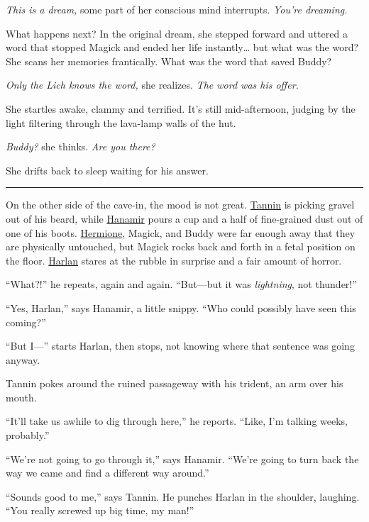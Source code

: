\documentclass[smalldemyvopaper,11pt,twoside,onecolumn,openright,extrafontsizes]{memoir}
\begin{document}
\emph{This is a dream,} some part of her conscious mind interrupts.
\emph{You're dreaming.}

What happens next? In the original dream, she stepped forward and
uttered a word that stopped Magick and ended her life instantly\ldots{}
but what was the word? She scans her memories frantically. What was the
word that saved Buddy?

\emph{Only the Lich knows the word,} she realizes. \emph{The word was
his offer.}

She startles awake, clammy and terrified. It's still mid-afternoon,
judging by the light filtering through the lava-lamp walls of the hut.

\emph{Buddy?} she thinks. \emph{Are you there?}

She drifts back to sleep waiting for his answer.

\begin{center}\rule{0.5\linewidth}{\linethickness}\end{center}

On the other side of the cave-in, the mood is not great.
\href{/characters/tannin/}{Tannin} is picking gravel out of his beard,
while \href{/characters/hanamir/}{Hanamir} pours a cup and a half of
fine-grained dust out of one of his boots.
\href{/characters/hermione/}{Hermione}, Magick, and Buddy were far
enough away that they are physically untouched, but Magick rocks back
and forth in a fetal position on the floor.
\href{/characters/harlan/}{Harlan} stares at the rubble in surprise and
a fair amount of horror.

``What?!'' he repeats, again and again. ``But---but it was
\emph{lightning}, not thunder!''

``Yes, Harlan,'' says Hanamir, a little snippy. ``Who could possibly
have seen this coming?''

``But I---'' starts Harlan, then stops, not knowing where that sentence
was going anyway.

Tannin pokes around the ruined passageway with his trident, an arm over
his mouth.

``It'll take us awhile to dig through here,'' he reports. ``Like, I'm
talking weeks, probably.''

``We're not going to go through it,'' says Hanamir. ``We're going to
turn back the way we came and find a different way around.''

``Sounds good to me,'' says Tannin. He punches Harlan in the shoulder,
laughing. ``You really screwed up big time, my man!''
\end{document}
